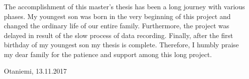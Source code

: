 \documentclass[english,12pt,a4paper,pdftex,elec,utf8]{aaltothesis}
\begin{document}



\author{Miika Ihonen}

\date{13.11.2017}




\makecoverpage






The accomplishment of this master's thesis has been a long journey with various phases. My youngest son was born in the very beginning of this project and changed the ordinary life of our entire family. Furthermore, the project was delayed in result of the slow process of data recording. Finally, after the first birthday of my youngest son my thesis is complete. Therefore, I humbly praise my dear family for the patience and support among this long project.

\vspace{5cm}
Otaniemi, 13.11.2017
\end{document}
